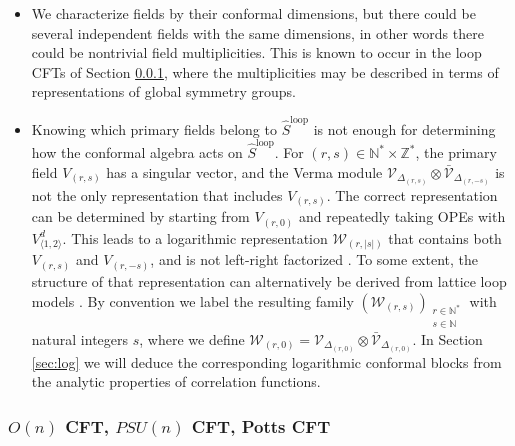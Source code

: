 \documentclass[12pt, a4paper]{article}
\begin{document}
\begin{itemize}
 \item We characterize fields by their conformal dimensions, but there could be several independent fields with the same dimensions, in other words there could be nontrivial field multiplicities. This is known to occur in the loop CFTs of Section \ref{sec:models}, where the multiplicities may be described in terms of representations of global symmetry groups.
 \item Knowing which primary fields belong to $\widehat{S}^\text{loop}$ is not enough for determining how the conformal algebra acts on $\widehat{S}^\text{loop}$. For $(r,s)\in \mathbb{N}^*\times \mathbb{Z}^*$, the primary field $V_{(r,s)}$ has a singular vector, and the Verma module $\mathcal{V}_{\Delta_{(r,s)}}\otimes\bar{\mathcal{V}}_{\Delta_{(r,-s)}}$ is not the only representation that includes $V_{(r,s)}$. The correct representation can be determined by starting from $V_{(r,0)}$ and repeatedly taking OPEs with $V^d_{\langle 1,2\rangle}$. This leads to a logarithmic representation $\mathcal{W}_{(r,|s|)}$ that contains both $V_{(r,s)}$ and $V_{(r,-s)}$, and is not left-right factorized \cite{nr20}.
 To some extent, the structure of that representation can alternatively be derived from lattice loop models \cite{glhjs20}.
 By convention we label the resulting family $\left(\mathcal{W}_{(r,s)}\right)_{\substack{r\in \mathbb{N}^*\\ s\in\mathbb{N}}}$ with natural integers $s$, where we define
 $\mathcal{W}_{(r,0)}= \mathcal{V}_{\Delta_{(r,0)}}\otimes\bar{\mathcal{V}}_{\Delta_{(r,0)}}$.
In Section \ref{sec:log} we will deduce the corresponding logarithmic conformal blocks from the analytic properties of correlation functions.
\end{itemize}


\subsubsection{$O(n)$ CFT, $PSU(n)$ CFT, Potts CFT}\label{sec:models}
\end{document}
